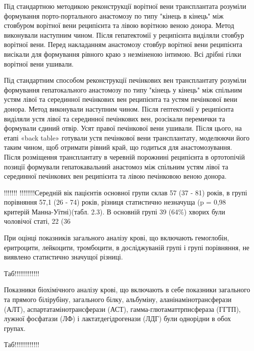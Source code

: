 Під стандартною методикою реконструкції ворітної вени трансплантата розуміли формування порто-портального анастомозу по типу "кінець в кінець" між стовбуром ворітної вени реципієнта та лівою ворітною веною донора. Метод виконували наступним чином. Після гепатектомії у реципієнта виділяли стовбур ворітної вени. Перед накладанням анастомозу стовбур ворітної вени реципієнта висікали для формування рівного краю з незміненою інтимою. Всі дрібні гілки ворітної вени ушивали. 

Під стандартним способом реконструкції печінкових вен трансплантату розуміли формування гепатокального анастомозу по типу "кінець у кінець" між спільним устям лівої та серединної печінкових вен реципієнта та устям печінкової вени донора. Метод виконували наступним чином. Після гептектомії у реципієнта виділяли устя лівої та серединної печінкових вен, розсікали перемички та формували єдиний отвір. Усят правої печінкової вени ушивали. Після цього, на етапі «back table» готували устя печінкової вени трансплантату, моделюючи його таким чином, щоб отримати рівний край, що годиться для анастомозування. Після розміщення трансплантату в черевній порожнині реципієнта в ортотопічій позиції формували гепатокавальний анастомоз між спільним устям лівої та серединної печінкових вен реципієнта та лівою печінковою веною донора.





!!!!!!!  !!!!!!!!Середній вік пацієнтів основної групи склав 57 (37 - 81) років, в групі порівняння 57,1 (26 - 74) років, різниця статистично незначуща (p = 0,98 критерій Манна-Уїтні)(табл. 2.3). В основній групі 39 (64\%) хворих були чоловічої статі, 22 (36 %


При оцінці показників загального аналізу крові, що включають гемоглобін, еритроцити, лейкоцити, тромбоцити, в досліджуваній групі і групі порівняння, не виявлено статистично значущої різниці. 


Таб!!!!!!!!!!!!!

Показники біохімічного аналізу крові, що включають в себе показники загального та прямого білірубіну, загального білку, альбуміну, аланінамінотрансферази (АЛТ), аспартатамінотрансферази (АСТ), гамма-глютаматтрпнсфераза (ГГТП), лужної фосфатази (ЛФ) і лактатдегідрогенази (ЛДГ) були однорідни в обох групах.

Таб!!!!!!!!!!!!!


